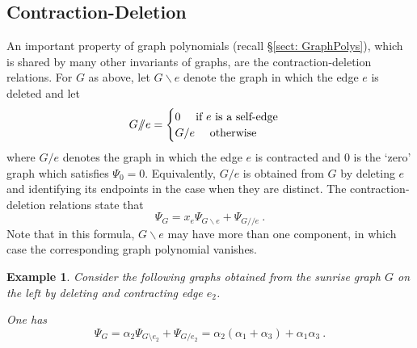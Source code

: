\documentclass[12pt]{amsart}
\theoremstyle{plain}
\newtheorem{ex}[thm]{Example}
\newcommand{\q}{/\!\!/}
\newcommand{\0}{\color{blue}{\mathsf{0}}}
\begin{document}
\subsection{Contraction-Deletion}  An important property of  graph polynomials (recall \S\ref{sect: GraphPolys}), which is shared by many other invariants of graphs,  are the  contraction-deletion relations. 
For $G$ as above, let 
$ G\backslash  e $ denote the graph in which the edge $e$ is deleted and let 
\[ G /\!\! / e  = \begin{cases} 0
\quad  \hbox{ if } e \hbox{ is a self-edge} \\ 
 G/e  \quad \hbox{ otherwise}  \end{cases} \]  where $G/e$ denotes the graph in which the edge $e$ is contracted and $0$ is the `zero' graph which satisfies $\Psi_0=0$. Equivalently, $G/e$ is obtained from $G$ by deleting $e$ and identifying its endpoints in the case when they are distinct.  The contraction-deletion relations state that 
 \[  \Psi_G = x_e \Psi_{G \backslash   e}  + \Psi_{G\q e}\ .\] 
 Note that in this formula, $G \backslash  e$ may have more than one component, in which case the corresponding graph polynomial vanishes. 
  \begin{ex} Consider the following graphs obtained from the sunrise graph $G$ on the left by deleting and contracting edge $e_2$.


\begin{figure}[h]
\end{figure}

  One has 
\[
  \Psi_G   =   \alpha_2 \Psi_{G\setminus e_2} + \Psi_{G/ e_2}   =   \alpha_2( \alpha_1 + \alpha_3) +  \alpha_1 \alpha_3 \ . \] 
  
  
  \end{ex}
\end{document}
